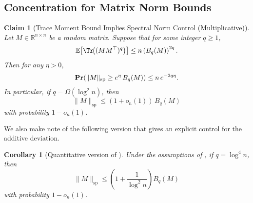 \documentclass[12pt]{article}
\def \E {\mathbb{E}}
\renewcommand{\Pr}{\mathop{\bf Pr\/}}
\newtheorem{claim}[theorem]{Claim}
\newtheorem{corollary}[theorem]{Corollary}
\begin{document}
\subsection{Concentration for Matrix Norm Bounds}
\begin{claim}[Trace Moment Bound Implies Spectral Norm Control (Multiplicative)] \label{claim:trace-to-norm-rough}
Let $M\in \mathbb{R}^{n\times n}$ be a random matrix. Suppose that for some integer $q\ge 1$,
\[
\E\!\left[\Tr\!\big((MM^\top)^q\big)\right]
\le
n\left(B_q(M)\right)^{2q}.
\]
Then for any $\eta>0$,
\[
\Pr\!\left(
\|M\|_{\mathrm{sp}} \ge e^{\eta}\, B_q(M)
\right)
\le
n\, e^{-2q\eta}.
\]
In particular, if $q=\Omega(\log^2 n)$, then
\[
\|M\|_{\mathrm{sp}}
\le
(1+o_n(1))\, B_q(M)
\]
with probability $1-o_n(1)$.
\end{claim}
%
%
%
We also make note of the following version that gives an explicit control for the additive deviation.

\begin{corollary}[Quantitative version of ]
\label{cor:trace-to-norm-quant}
Under the assumptions of , if $q=\log^4 n$, then
\[
\|M\|_{\mathrm{sp}}
\le
\left(1+\frac{1}{\log^2 n}\right) B_q(M)
\]
with probability $1-o_n(1)$.
\end{corollary}
\end{document}
